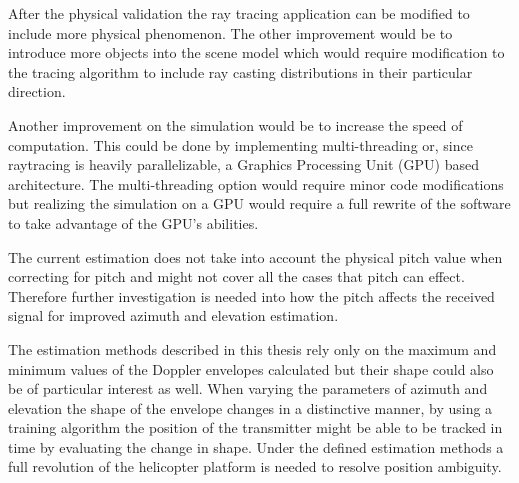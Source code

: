 After the physical validation the ray tracing application can be modified to include more physical phenomenon. The other improvement would be to introduce more objects into the scene model which would require modification to the tracing algorithm to include ray casting distributions in their particular direction.

Another improvement on the simulation would be to increase the speed of computation. This could be done by implementing multi-threading or, since raytracing is heavily parallelizable, a Graphics Processing Unit (GPU) based architecture. The multi-threading option would require minor code modifications but realizing the simulation on a GPU would require a full rewrite of the software to take advantage of the GPU's abilities. 

The current estimation does not take into account the physical pitch value when correcting for pitch and might not cover all the cases that pitch can effect. Therefore further investigation is needed into how the pitch affects the received signal for improved azimuth and elevation estimation.

The estimation methods described in this thesis rely only on the maximum and minimum values of the Doppler envelopes calculated but their shape could also be of particular interest as well. When varying the parameters of azimuth and elevation the shape of the envelope changes in a distinctive manner, by using a training algorithm the position of the transmitter might be able to be tracked in time by evaluating the change in shape. Under the defined estimation methods a full revolution of the helicopter platform is needed to resolve position ambiguity.
 
